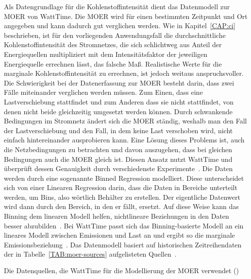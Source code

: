 Als Datengrundlage für die Kohlenstoffintensität dient das Datenmodell zur \ac{MOER} von WattTime.
Die \ac{MOER} wird für einen bestimmten Zeitpunkt und Ort angegeben und kann dadurch gut verglichen werden.
Wie in Kapitel~\ref{CAP:ci} beschrieben, ist für den vorliegenden Anwendungsfall die durchschnittliche Kohlenstoffintensität des Stromnetzes, die sich schlichtweg aus Anteil der Energiequellen multipliziert mit dem Intensitätsfaktor der jeweiligen Energiequelle errechnen lässt, das falsche Maß.
Realistische Werte für die marginale Kohlenstoffintensität zu errechnen, ist jedoch weitaus anspruchsvoller.
Die Schwierigkeit bei der Datenerfassung zur \ac{MOER} besteht darin, dass zwei Fälle miteinander verglichen werden müssen.
Zum Einen, dass eine Lastverschiebung stattfindet und zum Anderen dass sie nicht stattfindet, von denen nicht beide gleichzeitig umgesetzt werden können.
Durch schwankende Bedingungen im Stromnetz ändert sich die \ac{MOER} ständig, weshalb man den Fall der Lastverschiebung und den Fall, in dem keine Last verschoben wird, nicht einfach hintereinander ausprobieren kann.
Eine Lösung dieses Problems ist, auch die Netzbedingungen zu betrachten und davon auszugehen, dass bei gleichen Bedingungen auch die \ac{MOER} gleich ist.
Diesen Ansatz nutzt WattTime und überprüft dessen Genauigkeit durch verschiedenste Experimente~\cite{WattTime.2022}.
Die Daten werden durch eine sogenannte Binned Regression modelliert.
Diese unterscheidet sich von einer Linearen Regression darin, dass die Daten in Bereiche unterteilt werden, um \glqq Bins\grqq{}, also wörtlich Behälter zu erstellen.
Der eigentliche Datenwert wird dann durch den Bereich, in den er fällt, ersetzt.
Auf diese Weise kann das \glqq Binning\grqq{} dem linearen Modell helfen, nichtlineare Beziehungen in den Daten besser abzubilden~\cite{Muller.2017}.
Bei WattTime passt sich das Binning-basierte Modell an ein lineares Modell zwischen Emissionen und Last an und ergibt so die marginale Emissionsbeziehung~\cite{WattTime.2022}.
Das Datenmodell basiert auf historischen Zeitreihendaten der in Tabelle~\ref{TAB:moer-sources} aufgelisteten Quellen~\cite{WattTime.20231121T18:47:09+00:00}.
\begin{table}[t]
 \caption[Datenquellen MOER Modellierung]{Die Datenquellen, die WattTime für die Modellierung der MOER verwendet (\cite{WattTime.20231121T18:47:09+00:00})}
 \label{TAB:moer-sources}
 
\end{table}

